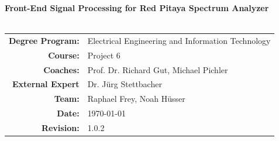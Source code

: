 \documentclass[a4paper,oneside]{alpenthesis/alpenthesis}
\begin{document}
%
%
\begin{titlingpage}
    \flushright\sffamily
    \enlargethispage{10ex}

    \vspace*{5em}
    
    \Huge\bfseries{Front-End Signal Processing for Red Pitaya Spectrum Analyzer}\\[1ex]
    \Large{}\\[3ex]

    \normalsize\mdseries

    

    \vfill
    \begin{tabular}{>{\bfseries}rl}
        Degree Program: & Electrical Engineering and Information Technology \\[2mm]
        Course:         & Project \num{6}\\[2mm]
        Coaches:        & Prof. Dr. Richard Gut, Michael Pichler \\[2mm]
        External Expert & Dr. J\"urg Stettbacher \\[2mm]
        Team:           & Raphael Frey, Noah H\"usser \\[2mm]
        Date:           & \today \\[2mm]
        Revision:       & 1.0.2 \\[2mm]
    \end{tabular}

    \tikzexternaldisable
    \tikzexternalenable
\end{titlingpage} %
\end{document}
